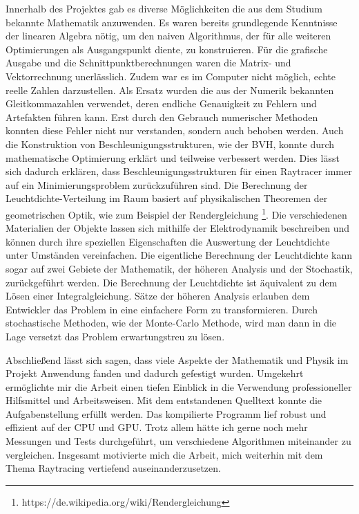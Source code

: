 \documentclass[crop=false]{standalone}
\begin{document}
    Innerhalb des Projektes gab es diverse Möglichkeiten die aus dem Studium bekannte Mathematik anzuwenden.
    Es waren bereits grundlegende Kenntnisse der linearen Algebra nötig, um den naiven Algorithmus, der für alle weiteren Optimierungen als Ausgangspunkt diente, zu konstruieren.
    Für die grafische Ausgabe und die Schnittpunktberechnungen waren die Matrix- und Vektorrechnung unerlässlich.
    Zudem war es im Computer nicht möglich, echte reelle Zahlen darzustellen.
    Als Ersatz wurden die aus der Numerik bekannten Gleitkommazahlen verwendet, deren endliche Genauigkeit zu Fehlern und Artefakten führen kann.
    Erst durch den Gebrauch numerischer Methoden konnten diese Fehler nicht nur verstanden, sondern auch behoben werden.
    Auch die Konstruktion von Beschleunigungsstrukturen, wie der BVH, konnte durch mathematische Optimierung erklärt und teilweise verbessert werden.
    Dies lässt sich dadurch erklären, dass Beschleunigungsstrukturen für einen Raytracer immer auf ein Minimierungsproblem zurückzuführen sind.
    Die Berechnung der Leuchtdichte-Verteilung im Raum basiert auf physikalischen Theoremen der geometrischen Optik, wie zum Beispiel der Rendergleichung%
    \footnote{https://de.wikipedia.org/wiki/Rendergleichung}.
    Die verschiedenen Materialien der Objekte lassen sich mithilfe der Elektrodynamik beschreiben und können durch ihre speziellen Eigenschaften die Auswertung der Leuchtdichte unter Umständen vereinfachen.
    Die eigentliche Berechnung der Leuchtdichte kann sogar auf zwei Gebiete der Mathematik, der höheren Analysis und der Stochastik, zurückgeführt werden.
    Die Berechnung der Leuchtdichte ist äquivalent zu dem Lösen einer Integralgleichung.
    Sätze der höheren Analysis erlauben dem Entwickler das Problem in eine einfachere Form zu transformieren.
    Durch stochastische Methoden, wie der Monte-Carlo Methode, wird man dann in die Lage versetzt das Problem erwartungstreu zu lösen.

    Abschließend lässt sich sagen, dass viele Aspekte der Mathematik und Physik im Projekt Anwendung fanden und dadurch gefestigt wurden.
    Umgekehrt ermöglichte mir die Arbeit einen tiefen Einblick in die Verwendung professioneller Hilfsmittel und Arbeitsweisen.
    Mit dem entstandenen Quelltext konnte die Aufgabenstellung erfüllt werden.
    Das kompilierte Programm lief robust und effizient auf der CPU und GPU.
    Trotz allem hätte ich gerne noch mehr Messungen und Tests durchgeführt, um verschiedene Algorithmen miteinander zu vergleichen.
    Insgesamt motivierte mich die Arbeit, mich weiterhin mit dem Thema Raytracing vertiefend auseinanderzusetzen.
\end{document}
